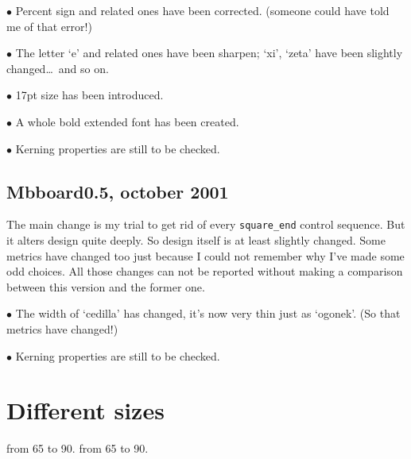 \item{$\bullet$}
Percent sign and related ones have been corrected.
(someone could have told me of that error!)

\item{$\bullet$}
The letter `e' and related ones have been sharpen;
`xi', `zeta' have been slightly changed\dots\ and so on.

\item{$\bullet$} 17pt size has been introduced.

\item{$\bullet$} A whole bold extended font has been created.

\item{$\bullet$}
Kerning properties are still to be checked.

\subsection{Mbboard0.5, october 2001}
The main change is my trial to get rid of every {\tt square\_end}
control sequence. But it alters design quite deeply. So design
itself is at least slightly changed. Some metrics have changed
too just because I could not remember why I've made some odd
choices. All  those changes can not be reported without making
a comparison between this version and the former one.

\item{$\bullet$}
The width of `cedilla' has changed, it's now very thin just
as `ogonek'. (So that metrics have changed!)

\item{$\bullet$}
Kerning properties are still to be checked.

\fuzzytext
\let\proofmode=!

\normaltext

\section{Different sizes}

%
%
from 65 to 90.
from 65 to 90.

